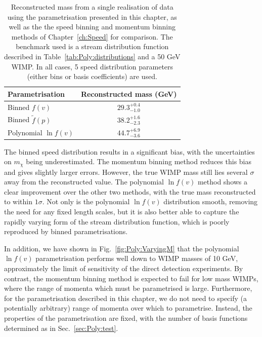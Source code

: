 \begin{table}[t]
  \setlength{\extrarowheight}{5pt}
  \begin{center}
	\begin{tabular}{lc}
         \hline\hline
	 Parametrisation & Reconstructed mass (GeV) \\
	 \hline
	 Binned $f(v)$ & \(29.3^{+0.4}_{-1.0}\) \\
	 Binned $\tilde{f}(p)$ & \(38.2^{+1.6}_{-2.3}\)\\
	 Polynomial $\ln f(v)$ & \(44.7^{+6.9}_{-3.6}\) \\
         \hline\hline
	\end{tabular}
  \end{center}
  \caption[Comparison of WIMP mass reconstruction using the binned speed, binned momentum and polynomial $\ln f(v)$ parametrisations]{Reconstructed mass from a single realisation of data using the parametrisation presented in this chapter, as well as the the speed binning and momentum binning methods of Chapter~\ref{ch:Speed} for comparison. The benchmark used is a stream distribution function described in Table~\ref{tab:Poly:distributions} and a 50 GeV WIMP. In all cases, 5 speed distribution parameters (either bins or basis coefficients) are used.}
\label{tab:Poly:ReconstructedMass}
\end{table}

The binned speed distribution results in a significant bias, with the uncertainties on $m_\chi$ being underestimated. The momentum binning method reduces this bias and gives slightly larger errors. However, the true WIMP mass still lies several $\sigma$ away from the reconstructed value. The polynomial $\ln f(v)$ method shows a clear improvement over the other two methods, with the true mass reconstructed to within $1\sigma$. Not only is the polynomial $\ln f(v)$ distribution smooth, removing the need for any fixed length scales, but it is also better able to capture the rapidly varying form of the stream distribution function, which is poorly reproduced by binned parametrisations.

In addition, we have shown in Fig.~\ref{fig:Poly:VaryingM} that the polynomial $\ln f(v)$ parametrisation performs well down to WIMP masses of 10 GeV, approximately the limit of sensitivity of the direct detection experiments. By contrast, the momentum binning method is expected to fail for low mass WIMPs, where the range of momenta which must be parametrised is large. Furthermore, for the parametrisation described in this chapter, we do not need to specify (a potentially arbitrary) range of momenta over which to parametrise. Instead, the properties of the parametrisation are fixed, with the number of basis functions determined as in Sec.~\ref{sec:Poly:test}.

